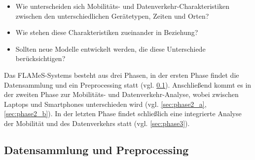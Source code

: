 \documentclass[12pt, a4paper]{article}
\begin{document}
\begin{itemize}
    \item Wie unterscheiden sich Mobilitäts- und Datenverkehr-Charakteristiken zwischen den unterschiedlichen Gerätetypen,
    Zeiten und Orten?
    \item Wie stehen diese Charakteristiken zueinander in Beziehung?
    \item Sollten neue Modelle entwickelt werden, die diese Unterschiede berücksichtigen?
\end{itemize}

Das FLAMeS-Systems besteht aus drei Phasen, in der ersten Phase findet die Datensammlung und ein Preprocessing statt
(vgl. \ref{sec:phase1}). Anschließend kommt es in der zweiten Phase zur Mobilitäts- und Datenverkehr-Analyse, wobei zwischen
Laptops und Smartphones unterschieden wird (vgl. \ref{sec:phase2_a}, \ref{sec:phase2_b}).
In der letzten Phase findet schließlich eine integrierte Analyse der Mobilität und des Datenverkehrs statt (vgl. \ref{sec:phase3}).

\subsection{Datensammlung und Preprocessing}
\label{sec:phase1}
\end{document}
